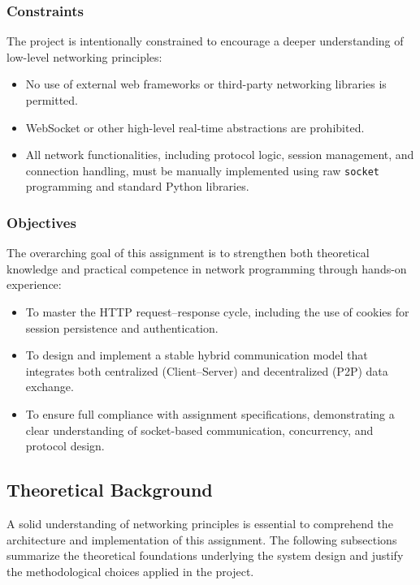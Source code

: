\subsubsection{Constraints}

The project is intentionally constrained to encourage a deeper understanding of low-level networking principles:
\begin{itemize}
\item No use of external web frameworks or third-party networking libraries is permitted.
\item WebSocket or other high-level real-time abstractions are prohibited.
\item All network functionalities, including protocol logic, session management, and connection handling, must be manually implemented using raw \texttt{socket} programming and standard Python libraries.
\end{itemize}

\subsubsection{Objectives}
The overarching goal of this assignment is to strengthen both theoretical knowledge and practical competence in network programming through hands-on experience:
\begin{itemize}
\item To master the HTTP request–response cycle, including the use of cookies for session persistence and authentication.
\item To design and implement a stable hybrid communication model that integrates both centralized (Client–Server) and decentralized (P2P) data exchange.
\item To ensure full compliance with assignment specifications, demonstrating a clear understanding of socket-based communication, concurrency, and protocol design.
\end{itemize}

\subsection{Theoretical Background}

A solid understanding of networking principles is essential to comprehend the architecture and implementation of this assignment. The following subsections summarize the theoretical foundations underlying the system design and justify the methodological choices applied in the project.

